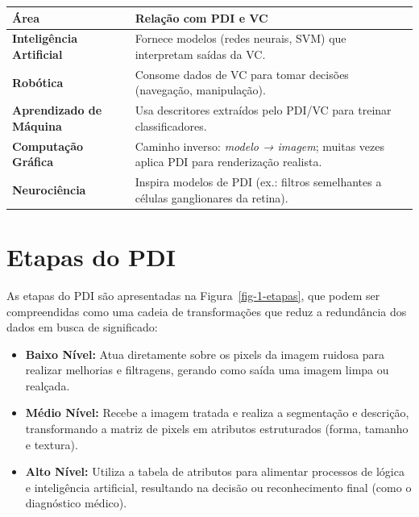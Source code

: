 \documentclass[
  portuguese,
  letterpaper,
  openany,
  oneside,
  12pt,
  a4paper]{book}
\providecommand{\tightlist}{%
  \setlength{\itemsep}{0pt}\setlength{\parskip}{0pt}}
\begin{document}
\begin{longtable}[]{@{}
  >{\raggedright\arraybackslash}p{}
  >{\raggedright\arraybackslash}p{}@{}}
\toprule\noalign{}
\begin{minipage}[b]{\linewidth}\raggedright
Área
\end{minipage} & \begin{minipage}[b]{\linewidth}\raggedright
Relação com PDI e VC
\end{minipage} \\
\midrule\noalign{}
\endhead
\bottomrule\noalign{}
\endlastfoot
\textbf{Inteligência Artificial} & Fornece modelos (redes neurais, SVM)
que interpretam saídas da VC. \\
\textbf{Robótica} & Consome dados de VC para tomar decisões (navegação,
manipulação). \\
\textbf{Aprendizado de Máquina} & Usa descritores extraídos pelo PDI/VC
para treinar classificadores. \\
\textbf{Computação Gráfica} & Caminho inverso: \emph{modelo → imagem};
muitas vezes aplica PDI para renderização realista. \\
\textbf{Neurociência} & Inspira modelos de PDI (ex.: filtros semelhantes
a células ganglionares da retina). \\
\end{longtable}

\section{Etapas do PDI}\label{etapas-do-pdi}

As etapas do PDI são apresentadas na Figura~\ref{fig-1-etapas}, que
podem ser compreendidas como uma cadeia de transformações que reduz a
redundância dos dados em busca de significado:

\begin{itemize}
\tightlist
\item
  \textbf{Baixo Nível:} Atua diretamente sobre os pixels da imagem
  ruidosa para realizar melhorias e filtragens, gerando como saída uma
  imagem limpa ou realçada.
\item
  \textbf{Médio Nível:} Recebe a imagem tratada e realiza a segmentação
  e descrição, transformando a matriz de pixels em atributos
  estruturados (forma, tamanho e textura).
\item
  \textbf{Alto Nível:} Utiliza a tabela de atributos para alimentar
  processos de lógica e inteligência artificial, resultando na decisão
  ou reconhecimento final (como o diagnóstico médico).
\end{itemize}
\end{document}
